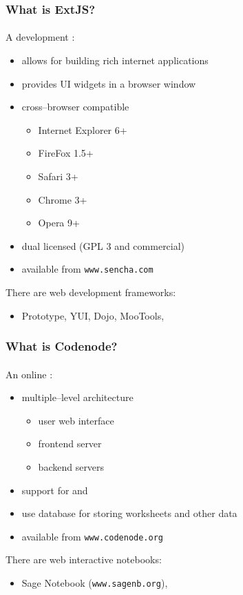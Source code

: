 \documentclass{beamer}
\begin{document}
\begin{frame}
    \frametitle{What is ExtJS?}
    \framesubtitle{}

    A  development :
    \pause
    \begin{itemize}
        \item allows for building rich internet applications
        \pause
        \item provides UI widgets in a browser window
        \pause
        \item cross--browser compatible
            \begin{itemize}
                \item Internet Explorer 6+
                \item FireFox 1.5+
                \item Safari 3+
                \item Chrome 3+
                \item Opera 9+
            \end{itemize}
        \pause
        \item dual licensed (GPL 3 and commercial)
        \pause
        \item available from \texttt{www.sencha.com}
    \end{itemize}
    \pause
    There are  web development frameworks:
    \begin{itemize}
        \item Prototype, YUI, Dojo, MooTools, \structure{\ldots}
    \end{itemize}
\end{frame}

\begin{frame}
    \frametitle{What is Codenode?}
    \framesubtitle{}

    An  online :
    \pause
    \begin{itemize}
        \item multiple--level architecture
            \begin{itemize}
                \item user web interface
                \pause
                \item frontend server
                \pause
                \item backend servers
            \end{itemize}
        \item support for  and 
        \item use database for storing worksheets and other data
        \pause
        \item available from \texttt{www.codenode.org}
    \end{itemize}
    \pause
    There are  web interactive notebooks:
    \begin{itemize}
        \item Sage Notebook (\texttt{www.sagenb.org}), \structure{\ldots}
    \end{itemize}
\end{frame}
\end{document}
